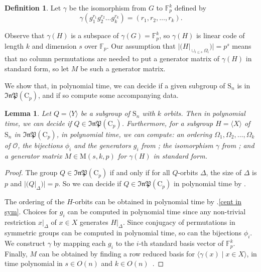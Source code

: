 \documentclass[11pt,a4paper]{article}
\newtheorem{lemma}[theorem]{Lemma}
\theoremstyle{definition}
\newtheorem{definition}[theorem]{Definition}
\theoremstyle{remark}
\newcommand{\Sym}[0]{\mathrm{Sym}}
\newcommand{\lists}[3]{ {#1}_1 {#2} {#1}_2 {#2} \ldots {#2} {#1}_{#3}  }
\newcommand{\InP}{\mathfrak{InP}}
\newcommand{\Sy}{\mathrm{S}}
\newcommand{\Cy}{\mathrm{C}}
\begin{document}
\begin{definition} \label{def: mapping direct prod of cyclic group to field}
Let $\gamma$ be the isomorphism from $G$ to $\mathds{F}_p^k$ defined by
\[
\gamma(g_1^{r_1} g_2^{r_2} \ldots g_k^{r_k})= (\lists{r}{,}{k}) . 
\]
\end{definition}


Observe that $\gamma(H)$ is a subspace of $\gamma(G) = \mathds{F}_p^k$, so $\gamma(H)$ is linear code of length $k$ and dimension $s$ over $\mathds{F}_p$. 
Our assumption that $|(H|_{\cup_{i \leq s} \Omega_i})| = p^s$ means that no column permutations are needed to put a generator matrix of $\gamma(H)$ in standard form, so let $M$ be such a generator matrix.

We show that, in polynomial time, we can decide if a given subgroup of $\Sy_n$ is in $\mathfrak{InP}(\Cy_p)$, and if so compute some accompanying data. 


\begin{lemma} \label{detect H in InP(Cp) in poly time}\label{gi and phii in poly time}
Let $Q = \langle Y \rangle$ be a subgroup of $\Sy_n$ with $k$ orbits. Then in polynomial time, we can decide if $Q \in \InP(\Cy_p)$. 
Furthermore, for a subgroup $H = \langle X \rangle$ of $\Sy_n$ in $\InP(\Cy_p)$, in polynomial time, we can compute: 
an ordering $\Omega_1, \Omega_2, \ldots, \Omega_k$ of $\mathcal{O}$, the bijections $\phi_i$ and the generators $g_i$ from ; the isomorphism $\gamma$ from ; and a generator matrix $M \in \mathrm{M}(s,k,p)$ for $\gamma(H)$ in standard form. 
\end{lemma}

\begin{proof}
The group $Q \in \InP(\Cy_p)$ if and only if for all $Q$-orbits $\Delta$, the size of $\Delta$ is $p$ and $|(Q|_{\Delta})|=p$. So we can decide if $Q \in \InP(\Cy_p)$ in polynomial time by . 

The ordering of the $H$-orbits can be obtained in polynomial time by .\ref{cent in sym}. 
Choices for $g_i$ can be computed in polynomial time since any non-trivial restriction $x|_{\Delta}$ of $x \in X$ generates $H|_{\Delta}$. 
Since conjugacy of permutations in symmetric groups can be computed in polynomial time, so can the bijections $\phi_i$. %
We construct $\gamma$ by mapping each $g_i$ to the $i$-th standard basis vector of $\mathds{F}_p^k$. Finally, $M$ can be obtained by finding a row reduced basis for $\langle \gamma(x) \mid x \in X \rangle$, in time polynomial in $s \in O(n)$ and $k \in O(n)$~\cite{linearAlgebra}. 
\end{proof}
\end{document}
